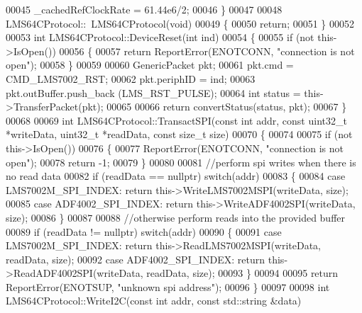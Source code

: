 \begin{DoxyCode}
00045     _cachedRefClockRate = 61.44e6/2;
00046 \}
00047 
00048 LMS64CProtocol::~LMS64CProtocol(\textcolor{keywordtype}{void})
00049 \{
00050     \textcolor{keywordflow}{return};
00051 \}
00052 
00053 \textcolor{keywordtype}{int} LMS64CProtocol::DeviceReset(\textcolor{keywordtype}{int} ind)
00054 \{
00055     \textcolor{keywordflow}{if} (not this->IsOpen())
00056     \{
00057         \textcolor{keywordflow}{return} ReportError(ENOTCONN, \textcolor{stringliteral}{"connection is not open"});
00058     \}
00059 
00060     GenericPacket pkt;
00061     pkt.cmd = CMD_LMS7002_RST;
00062     pkt.periphID = ind;
00063     pkt.outBuffer.push\_back (LMS_RST_PULSE);
00064     \textcolor{keywordtype}{int} status = this->TransferPacket(pkt);
00065 
00066     \textcolor{keywordflow}{return} convertStatus(status, pkt);
00067 \}
00068 
00069 \textcolor{keywordtype}{int} LMS64CProtocol::TransactSPI(\textcolor{keyword}{const} \textcolor{keywordtype}{int} addr, \textcolor{keyword}{const} uint32\_t *writeData, uint32\_t *readData, \textcolor{keyword}{const} \textcolor{keywordtype}{size\_t}
       size)
00070 \{
00074 
00075     \textcolor{keywordflow}{if} (not this->IsOpen())
00076     \{
00077         ReportError(ENOTCONN, \textcolor{stringliteral}{"connection is not open"});
00078         \textcolor{keywordflow}{return} -1;
00079     \}
00080 
00081     \textcolor{comment}{//perform spi writes when there is no read data}
00082     \textcolor{keywordflow}{if} (readData == \textcolor{keyword}{nullptr}) \textcolor{keywordflow}{switch}(addr)
00083     \{
00084     \textcolor{keywordflow}{case} LMS7002M_SPI_INDEX: \textcolor{keywordflow}{return} this->WriteLMS7002MSPI(writeData, size);
00085     \textcolor{keywordflow}{case} ADF4002_SPI_INDEX: \textcolor{keywordflow}{return} this->WriteADF4002SPI(writeData, size);
00086     \}
00087 
00088     \textcolor{comment}{//otherwise perform reads into the provided buffer}
00089     \textcolor{keywordflow}{if} (readData != \textcolor{keyword}{nullptr}) \textcolor{keywordflow}{switch}(addr)
00090     \{
00091     \textcolor{keywordflow}{case} LMS7002M_SPI_INDEX: \textcolor{keywordflow}{return} this->ReadLMS7002MSPI(writeData, readData, size);
00092     \textcolor{keywordflow}{case} ADF4002_SPI_INDEX: \textcolor{keywordflow}{return} this->ReadADF4002SPI(writeData, readData, size);
00093     \}
00094 
00095     \textcolor{keywordflow}{return} ReportError(ENOTSUP, \textcolor{stringliteral}{"unknown spi address"});
00096 \}
00097 
00098 \textcolor{keywordtype}{int} LMS64CProtocol::WriteI2C(\textcolor{keyword}{const} \textcolor{keywordtype}{int} addr, \textcolor{keyword}{const} std::string &data)

\end{DoxyCode}
